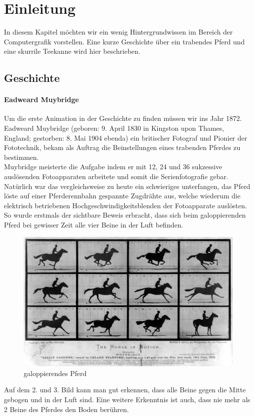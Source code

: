 \chapter{Einleitung}
In diesem Kapitel möchten wir ein wenig Hintergrundwissen im Bereich der Computergrafik vorstellen. Eine kurze Geschichte über ein trabendes Pferd und eine skurrile Teekanne wird hier beschrieben.

\section{Geschichte}

\subsubsection{Eadweard Muybridge}
Um die erste Animation in der Geschichte zu finden müssen wir ins Jahr 1872. 
Eadweard Muybridge (geboren: 9. April 1830 in Kingston upon Thames, England; gestorben: 8. Mai 1904 ebenda) 
ein britischer Fotograf und Pionier der Fototechnik, bekam als Auftrag die 
Beinstellungen eines trabenden Pferdes zu bestimmen. \\
Muybridge meisterte die Aufgabe indem er mit 12, 24 und 36 sukzessive auslösenden Fotoapparaten 
arbeitete und somit die Serienfotografie gebar. Natürlich war das 
vergleichsweise zu heute ein schwieriges unterfangen, das Pferd löste auf 
einer Pferderennbahn gespannte Zugdrähte aus, welche wiederum die elektrisch 
betriebenen Hochgeschwindigkeitsblenden der Fotoapparate auslösten. So wurde 
erstmals der sichtbare Beweis erbracht, dass sich beim galoppierenden Pferd 
bei gewisser Zeit alle vier Beine in der Luft befinden.\\

\begin{figure}[htbp]
\center
\includegraphics[scale=0.25]{include/The_Horse_in_Motion.jpg}
\caption{galoppierendes Pferd}
\end{figure}
Auf dem 2. und 3. Bild kann man gut erkennen, dass alle Beine gegen die Mitte gebogen und in der Luft sind. Eine weitere Erkenntnis ist auch, dass nie mehr als 2 Beine des Pferdes den Boden berühren. 

